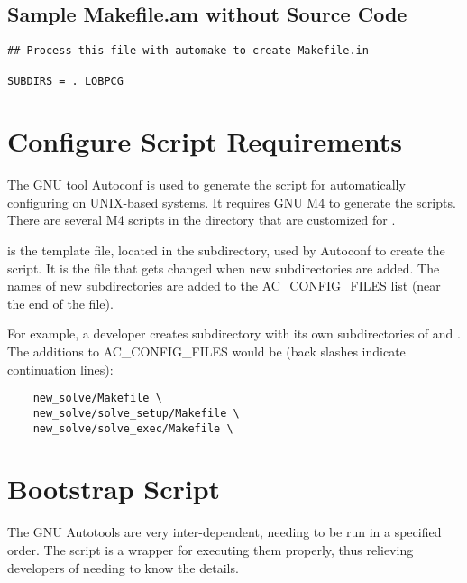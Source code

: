 \subsection{Sample Makefile.am without Source Code}
\label{Sample Makefile.am without Source Code}

\begin{verbatim}
## Process this file with automake to create Makefile.in

SUBDIRS = . LOBPCG

\end{verbatim}

\section{Configure Script Requirements}
\label{Configure Script Requirements}


The GNU tool Autoconf is used to generate the  script for automatically
configuring \hypre{} on UNIX-based systems.  It requires GNU M4 to generate the
scripts.  There are several M4 scripts in the  directory
that are customized for \hypre{}.

 is the template file, located in the  subdirectory, used 
by Autoconf to create the  script.  It is the file that gets changed
when new subdirectories are added.  The names of new subdirectories are added to
the AC_CONFIG_FILES list (near the end of the file).

For example, a developer creates subdirectory  with its own 
subdirectories of  and .  The additions to 
AC_CONFIG_FILES would be (back slashes indicate continuation lines):

\begin{verbatim}
    new_solve/Makefile \
    new_solve/solve_setup/Makefile \
    new_solve/solve_exec/Makefile \

\end{verbatim}

\section{Bootstrap Script}
\label{Bootstrap Script}


The GNU Autotools are very inter-dependent, needing to be run in a specified 
order.  The  script is a wrapper for executing them properly, 
thus relieving developers of needing to know the details.

